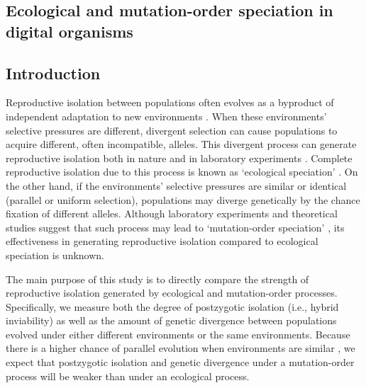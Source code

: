 \begin{doublespace}

\chapter{Ecological and mutation-order speciation in digital organisms}
\label{chap:ecol_mo}



\section{Introduction}

Reproductive isolation between populations
often evolves as a byproduct of independent adaptation
to new environments \citep{coy04,sch09,sob10}.
%
When these environments' selective pressures are different,
divergent selection can cause populations
to acquire different, often incompatible, alleles.
%
This divergent process can generate reproductive isolation
both in nature \citep[reviewed in][]{run05,sch09}
and in laboratory experiments \citetext{\citealp{det07,det08};
reviewed in \citealp{ric93} and \citealp{fry09}}.
%
Complete reproductive isolation due to this process
is known as `ecological speciation' \citep{sch09}.
%
On the other hand, if the environments' selective pressures
are similar or identical (parallel or uniform selection),
populations may diverge genetically
by the chance fixation of different alleles.
%
Although laboratory experiments and theoretical studies suggest that
such process may lead to `mutation-order speciation' \citep{sch09,nos11},
its effectiveness in generating reproductive isolation
compared to ecological speciation is unknown.









The main purpose of this study is to directly compare
the strength of reproductive isolation
generated by ecological and mutation-order processes.
%
Specifically, we measure both the degree of postzygotic isolation
(i.e., hybrid inviability)
as well as the amount of genetic divergence between populations
evolved under either different environments or the same environments.
%
Because there is a higher chance of parallel evolution
when environments are similar \citep{sch09b},
we expect that postzygotic isolation and genetic divergence
under a mutation-order process will be weaker than under an ecological process.





\end{doublespace}
